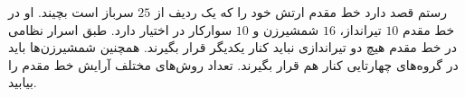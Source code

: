     \p 
رستم قصد دارد خط مقدم ارتش خود را که یک ردیف از
$25$
سرباز است بچیند. او در خط مقدم
$10$
تیرانداز،
$16$
شمشیرزن و
$10$
سوارکار در اختیار دارد. طبق اسرار نظامی در خط مقدم هیچ دو تیراندازی نباید کنار یکدیگر قرار بگیرند. همچنین شمشیرزن‌ها باید در گروه‌های چهارتایی کنار هم قرار بگیرند. تعداد روش‌های مختلف آرایش خط مقدم را بیابید.